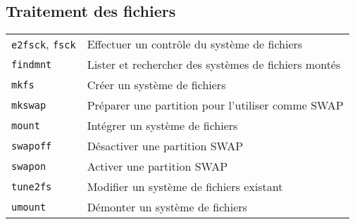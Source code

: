 \documentclass[10pt,a4paper]{article}
\begin{document}
\newpage

\cheatsheet

\begin{multicols}{2} 
\section{Traitement des fichiers}
\begin{tabular}{ p{2.5cm} p{8.5cm} }
  \hline
  \texttt{e2fsck}, \texttt{fsck} & Effectuer un contrôle du système de fichiers \\
  \rowcolor{Gray}
  \texttt{findmnt} & Lister et rechercher des systèmes de fichiers montés \\
  \texttt{mkfs} & Créer un système de fichiers \\
  \rowcolor{Gray}
  \texttt{mkswap} & Préparer une partition pour l'utiliser comme SWAP \\
  \texttt{mount} & Intégrer un système de fichiers \\
  \rowcolor{Gray}
  \texttt{swapoff} & Désactiver une partition SWAP \\
  \texttt{swapon} & Activer une partition SWAP \\
  \rowcolor{Gray}
  \texttt{tune2fs} & Modifier un système de fichiers existant \\
  \texttt{umount} & Démonter un système de fichiers \\
  \hline
\end{tabular}


\end{multicols}
\end{document}
